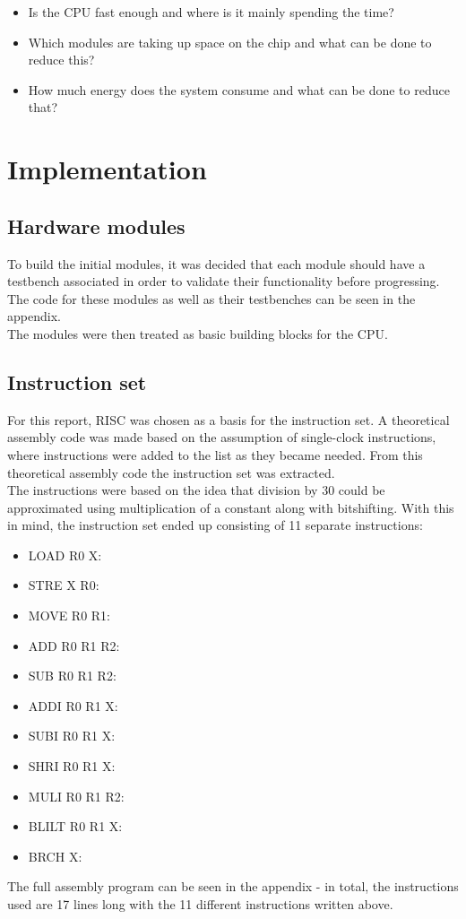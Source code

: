 \documentclass[12pt,a4paper]{article}
\begin{document}
	\begin{itemize}
		\item Is the CPU fast enough and where is it mainly spending the time?
		\item Which modules are taking up space on the chip and what can be done to reduce this?
		\item How much energy does the system consume and what can be done to reduce that?
	\end{itemize}
	
\section{Implementation}
\subsection{Hardware modules}
	To build the initial modules, it was decided that each module should have a testbench associated in order to validate their functionality before progressing. The code for these modules as well as their testbenches can be seen in the appendix.\\
	The modules were then treated as basic building blocks for the CPU.\\
	
\subsection{Instruction set}
	For this report, RISC was chosen as a basis for the instruction set. A theoretical assembly code was made based on the assumption of single-clock instructions, where instructions were added to the list as they became needed. From this theoretical assembly code the instruction set was extracted.\\
The instructions were based on the idea that division by 30 could be approximated using multiplication of a constant along with bitshifting.
With this in mind, the instruction set ended up consisting of 11 separate instructions:\\
	
	\begin{itemize}
			
			\item LOAD R0 X: \qquad[$R0=mem(X)$]
			\item STRE X R0: \;\qquad[$mem(X)=R0$]
			\item MOVE R0 R1: \,\,\quad[$R0=R1$]
			\item ADD R0 R1 R2: \quad[$R0=R1+R2$]
			\item SUB R0 R1 R2: \quad[$R0=R1-R2$]
			\item ADDI R0 R1 X: \quad[$R0=R1+X$]
			\item SUBI R0 R1 X: \quad[$R0=R1-X$]
			\item SHRI R0 R1 X: \quad[$R0=R1>>X$]
			\item MULI R0 R1 R2: \quad[$R0=R1*R2$]
			\item BLILT R0 R1 X: \quad[$if\;(R0>R1)\;goto\;X$]
			\item BRCH X: \qquad\qquad[$goto\;X$]
		\end{itemize}
	The full assembly program can be seen in the appendix - in total, the instructions used are 17 lines long with the 11 different instructions written above.
\end{document}
